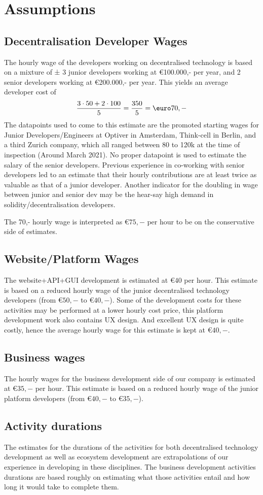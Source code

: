 \section{Assumptions}\label{sec:assumptions}
\subsection{Decentralisation Developer Wages}
The hourly wage of the developers working on decentralised technology is based on a mixture of ± 3 junior developers working at \euro 100.000,- per year, and 2 senior developers working at \euro 200.000,- per year. This yields an average developer cost of 
\begin{equation}
	\frac{3\cdot 50+2\cdot 100}{5}=\frac{350}{5}=\textup{\euro}70,-
\end{equation}
The datapoints used to come to this estimate are the promoted starting wages for Junior Developers/Engineers at Optiver in Amsterdam, Think-cell in Berlin, and a third Zurich company, which all ranged between 80 to 120k at the time of inspection (Around March 2021). No proper datapoint is used to estimate the salary of the senior developers. Previous experience in co-working with senior developers led to an estimate that their hourly contributions are at least twice as valuable as that of a junior developer. Another indicator for the doubling in wage between junior and senior dev may be the hear-say high demand in solidity/decentralisation developers.

The 70,- hourly wage is interpreted as \euro$75,-$ per hour to be on the conservative side of estimates.
\subsection{Website/Platform Wages}
The website+API+GUI development is estimated at \euro$40$ per hour. This estimate is based on a reduced hourly wage of the junior decentralised technology developers (from \euro$50,-$ to \euro$40,-$). Some of the development costs for these activities may be performed at a lower hourly cost price, this platform development work also contains UX design. And excellent UX design is quite costly, hence the average hourly wage for this estimate is kept at \euro$40,-$.

\subsection{Business wages}
The hourly wages for the business development side of our company is estimated at \euro$35,-$ per hour. This estimate is based on a reduced hourly wage of the junior platform developers (from \euro$40,-$ to \euro$35,-$).

\subsection{Activity durations}
The estimates for the durations of the activities for both decentralised technology development as well as ecosystem development are extrapolations of our experience in developing in these disciplines. The business development activities durations are based roughly on estimating what those activities entail and how long it would take to complete them.